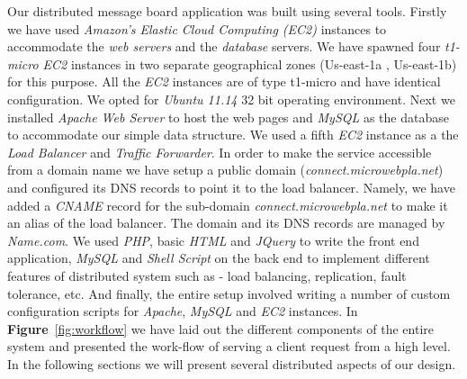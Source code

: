 \documentclass[12pt, twocolumn]{article}
\begin{document}
Our distributed message board application was built using several tools. Firstly we have used \emph{Amazon's Elastic Cloud Computing (EC2)} \cite{ec2} instances to accommodate the \emph{web servers} and the \emph{database} servers. We have spawned four  \emph{t1-micro EC2} \cite{t1micro} instances in two separate geographical zones (Us-east-1a , Us-east-1b) for this purpose. All the \emph{EC2} instances are of type t1-micro and have identical configuration. We opted for \emph{Ubuntu 11.14} 32 bit operating environment. Next we installed \emph{Apache Web Server} \cite{apache} to host the web pages and \emph{MySQL} \cite{mysql} as the database to accommodate our simple data structure. We used a fifth \emph{EC2} instance as a the \emph{Load Balancer} and \emph{Traffic Forwarder}. In order to make the service accessible from a domain name we have setup a public domain (\emph{connect.microwebpla.net}) and configured its DNS records to point it to the load balancer. Namely, we have added a \emph{CNAME} \cite{cname} record for the sub-domain \emph{connect.microwebpla.net} to make it an alias of the load balancer. The domain and its DNS records are managed by \emph{Name.com}. We used \emph{PHP}, basic \emph{HTML} and \emph{JQuery} \cite{jquery} to write the front end application, \emph{MySQL} and \emph{Shell Script} on the back end to implement different features of distributed system such as - load balancing, replication, fault tolerance, etc. And finally, the entire setup involved writing a number of custom configuration scripts for \emph{Apache}, \emph{MySQL} and \emph{EC2} instances. In  \textbf{Figure}~\ref{fig:workflow} we have laid out the different components of the entire system and presented the work-flow of serving a client request from a high level. In the following sections we will present several distributed aspects of our design.
\end{document}
